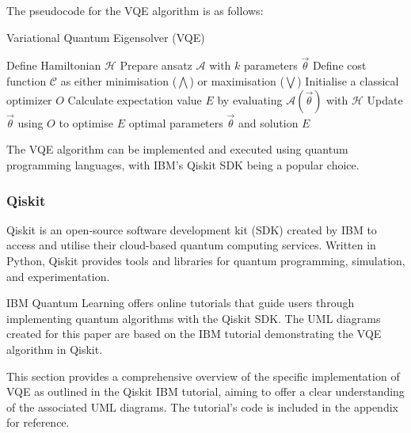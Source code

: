 \documentclass{article}
\newcounter{subsubsubsection}[subsubsection]
\begin{document}
{The pseudocode for the VQE algorithm is as follows:

\begin{algorithm}[H]
\caption{Variational Quantum Eigensolver (VQE)}\label{vqe_algorithm}
\begin{algorithmic}[1]
\State Define Hamiltonian \( \mathcal{H} \)
\State Prepare ansatz \( \mathcal{A} \) with \( k \) parameters \( \overrightarrow{\theta} \)
\State Define cost function $\mathcal{C}$ as either minimisation ($\bigwedge$) or maximisation ($\bigvee$)
\State Initialise a classical optimizer \( O \)
    \State Calculate expectation value \( E \) by evaluating \( \mathcal{A}(\overrightarrow{\theta}) \) with \( \mathcal{H} \)
    \State Update \( \overrightarrow{\theta} \) using \( O \) to optimise \( E \)
\EndWhile
\State \Return optimal parameters \( \overrightarrow{\theta} \) and solution \( E \)
\end{algorithmic}
\end{algorithm}

The VQE algorithm can be implemented and executed using quantum programming languages, with IBM’s Qiskit SDK being a popular choice.

\subsubsection{Qiskit}

Qiskit is an open-source software development kit (SDK) created by IBM to access and utilise their cloud-based quantum computing services. Written in Python, Qiskit provides tools and libraries for quantum programming, simulation, and experimentation\cite{qiskithomepage}.

IBM Quantum Learning offers online tutorials\cite{Tutorial} that guide users through implementing quantum algorithms with the Qiskit SDK. The UML diagrams created for this paper are based on the IBM tutorial demonstrating the VQE algorithm in Qiskit\cite{IBMVQETut}.


This section provides a comprehensive overview of the specific implementation of VQE as outlined in the Qiskit IBM tutorial\cite{Tutorial}, aiming to offer a clear understanding of the associated UML diagrams. The tutorial's code is included in the appendix for reference.

}
\end{document}
